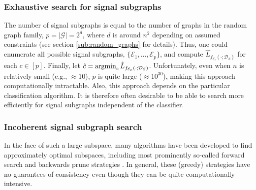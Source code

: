 \documentclass[10pt,journal,cspaper,compsoc]{IEEEtran}
\providecommand{\mc}[1]{\mathcal{#1}}
\providecommand{\mh}[1]{\hat{#1}}
\newcommand{\argmin}{\operatornamewithlimits{argmin}}
\begin{document}
\subsubsection{Exhaustive search for signal subgraphs} %
\label{ssub:classifier_based_signal_subgraph_searches}

The number of signal subgraphs is equal to the number of graphs in the random graph family, $p=|\mc{G}|=2^d$, where $d$ is around $n^2$ depending on assumed constraints (see section \ref{sub:random_graphs} for details).  Thus, one could enumerate all possible signal subgraphs, $\{\mc{E}_1,\ldots, \mc{E}_p\}$,
and compute $\mh{L}_{f_{\mc{E}_c}(\cdot; \mc{D}_S)}$ for each $c \in [p]$.  Finally, let $\mh{c}=\argmin_c \mh{L}_{f_{\mc{E}_c}(\cdot; \mc{D}_S)}$.  Unfortunately, even when $n$ is relatively small (e.g., $\approx 10$), $p$ is quite large ($\approx 10^{30}$), making this approach computationally intractable.  Also, this approach depends on the particular classification algorithm.  It is therefore often desirable to be able to search more efficiently for signal subgraphs independent of the classifier.



\subsubsection{Incoherent signal subgraph search} %
\label{ssub:classifier_free_signal_subgraph_searches}

In the face of such a large subspace, many algorithms have been developed to find approximately optimal subspaces, including most prominently so-called forward search and backwards prune strategies \cite{LiuYu05}.  In general, these (greedy) strategies have no guarantees of consistency even though they can be quite computationally intensive.  
\end{document}
